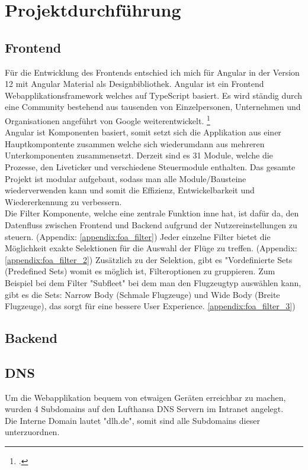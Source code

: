 \section{Projektdurchführung}

	\subsection{Frontend}
	Für die Entwicklung des Frontends entschied ich mich für Angular in der Version 12 mit Angular Material als Designbibliothek. Angular ist ein Frontend Webapplikationsframework welches auf TypeScript basiert. Es wird ständig durch eine Community bestehend aus tausenden von Einzelpersonen, Unternehmen und Organisationen angeführt von Google weiterentwickelt. \footcite{3}\\
	Angular ist Komponenten basiert, somit setzt sich die Applikation aus einer Hauptkompontente zusammen welche sich wiederumdann aus mehreren Unterkomponenten zusammensetzt. Derzeit sind es 31 Module, welche die Prozesse, den Liveticker und verschiedene Steuermodule enthalten. Das gesamte Projekt ist modular aufgebaut, sodass man alle Module/Bausteine wiederverwenden kann und somit die Effizienz, Entwickelbarkeit und Wiedererkennung zu verbessern.\\
	Die Filter Komponente, welche eine zentrale Funktion inne hat, ist dafür da, den Datenfluss zwischen Frontend und Backend aufgrund der Nutzereinstellungen zu steuern. (Appendix: \ref{appendix:foa_filter}) Jeder einzelne Filter bietet die Möglichkeit exakte Selektionen für die Auswahl der Flüge zu treffen. (Appendix: \ref{appendix:foa_filter_2}) Zusätzlich zu der Selektion, gibt es "Vordefinierte Sets (Predefined Sets) womit es möglich ist, Filteroptionen zu gruppieren. Zum Beispiel bei dem Filter "Subfleet" bei dem man den Flugzeugtyp auswählen kann, gibt es die Sets: Narrow Body (Schmale Flugzeuge) und Wide Body (Breite Flugzeuge), das sorgt für eine bessere User Experience. \ref{appendix:foa_filter_3})


	\subsection{Backend}
	\subsubsection{}
	\subsection{DNS}
	Um die Webapplikation bequem von etwaigen Geräten erreichbar zu machen, wurden 4 Subdomains auf den Lufthansa DNS Servern im Intranet angelegt.\\
	Die Interne Domain lautet "dlh.de", somit sind alle Subdomains dieser unterzuordnen. \\


